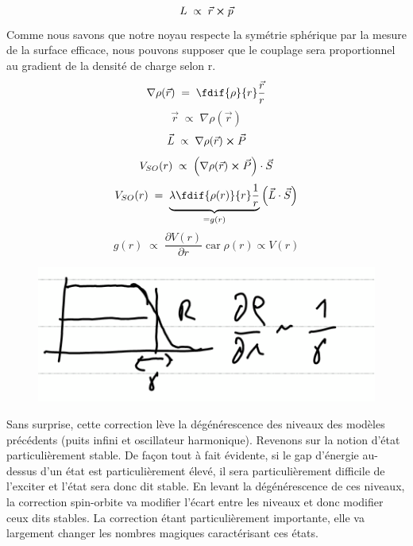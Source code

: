 \[
    L \; \propto\; \vec{r}\cross \vec{p}
\]
Comme nous savons que notre noyau respecte la symétrie sphérique par la mesure de la surface efficace, nous pouvons supposer que le couplage sera proportionnel au gradient de la densité de charge selon r.
\[
    \nabla \rho(\vec{r}) \eq \fdif{\rho}{r}\dfrac{\vec{r}}{r}
\]
\[
    \vec{r} \; \propto \; \nabla \rho(\vec{r})
\]
\[
    \vec{L}\;\propto\; \nabla \rho(\vec{r})\cross \vec{P}
\]
\[
    V_{SO}(r) \; \propto \; \left(\nabla \rho(\vec{r})\cross \vec{P}\right)\cdot \vec{S}
\]
\[
    V_{SO}(r) \eq\underbrace{  \lambda\fdif{\rho(r)}{r}\dfrac{1}{r}}_{= g(r)}\left(\vec{L}\cdot \vec{S}\right)
\]
\[
    g(r) \;\propto\; \dfrac{\partial V(r)}{\partial r} \; \text{car}\; \rho(r) \propto V(r)
\]
\begin{figure}[H]
    \centering
    \includegraphics{Images4/facteur_gamma.PNG}
\end{figure}
Sans surprise, cette correction lève la dégénérescence des niveaux des modèles précédents (puits infini et oscillateur harmonique). Revenons sur la notion d'état particulièrement stable. De façon tout à fait évidente, si le gap d'énergie au-dessus d'un état est particulièrement élevé, il sera particulièrement difficile de l'exciter et l'état sera donc dit stable. En levant la dégénérescence de ces niveaux, la correction spin-orbite va modifier l'écart entre les niveaux et donc modifier ceux dits stables. La correction étant particulièrement importante, elle va largement changer les nombres magiques caractérisant ces états.
